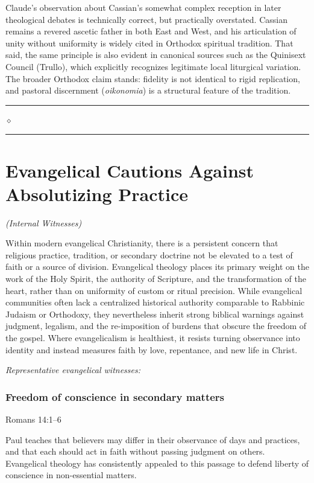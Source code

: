 \documentclass[10pt,twoside,openany]{book}
\newcommand{\ornrule}{%
  \par\bigskip
  {\noindent\hfil{\color{gold}\rule[0.5ex]{1.5in}{0.5pt}%
  \quad$\diamond$\quad%
  \rule[0.5ex]{1.5in}{0.5pt}}\hfil\par}%
  \bigskip
}
\begin{document}
\begin{gptbox}
Claude's observation about Cassian's somewhat complex
reception in later theological debates is technically
correct, but practically overstated. Cassian remains a
revered ascetic father in both East and West, and his
articulation of unity without uniformity is widely
cited in Orthodox spiritual tradition. That said, the
same principle is also evident in canonical sources
such as the Quinisext Council (Trullo), which
explicitly recognizes legitimate local liturgical
variation. The broader Orthodox claim stands: fidelity
is not identical to rigid replication, and pastoral
discernment (\emph{oikonomia}) is a structural feature of
the tradition.
\end{gptbox}

\ornrule



\chapter{Evangelical Cautions Against Absolutizing Practice}
\begin{center}
{\itshape (Internal Witnesses)}
\end{center}

Within modern evangelical Christianity, there is a persistent concern
that religious practice, tradition, or secondary doctrine not be
elevated to a test of faith or a source of division. Evangelical
theology places its primary weight on the work of the Holy Spirit, the
authority of Scripture, and the transformation of the heart, rather
than on uniformity of custom or ritual precision. While evangelical
communities often lack a centralized historical authority comparable to
Rabbinic Judaism or Orthodoxy, they nevertheless inherit strong
biblical warnings against judgment, legalism, and the re-imposition of
burdens that obscure the freedom of the gospel. Where evangelicalism is
healthiest, it resists turning observance into identity and instead
measures faith by love, repentance, and new life in Christ.

\medskip
\textit{Representative evangelical witnesses:}

\subsection{Freedom of conscience in secondary matters}
{\small Romans 14:1--6}

Paul teaches that believers may differ in their observance of days and
practices, and that each should act in faith without passing judgment
on others. Evangelical theology has consistently appealed to this
passage to defend liberty of conscience in non-essential matters.
\end{document}
